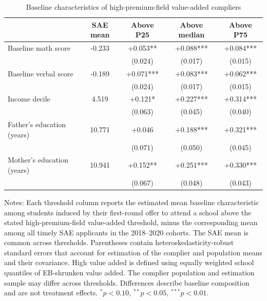 \begin{table}[!htbp]
\centering
\caption{Baseline characteristics of high-premium-field value-added compliers}
\label{tab:high-premium-field-va-complier-ses}
\begin{threeparttable}
\small
\setlength{\tabcolsep}{4pt}
\begin{tabular}{lcccc}
\toprule
 & SAE mean & Above P25 & Above median & Above P75 \\
\midrule
Baseline math score & -0.233 & +0.053** & +0.088*** & +0.084*** \\
 &  & (0.024) & (0.017) & (0.015) \\
Baseline verbal score & -0.189 & +0.071*** & +0.083*** & +0.062*** \\
 &  & (0.024) & (0.017) & (0.015) \\
Income decile & 4.519 & +0.121* & +0.227*** & +0.314*** \\
 &  & (0.063) & (0.045) & (0.040) \\
Father's education (years) & 10.771 & +0.046 & +0.188*** & +0.321*** \\
 &  & (0.071) & (0.050) & (0.045) \\
Mother's education (years) & 10.941 & +0.152** & +0.251*** & +0.330*** \\
 &  & (0.067) & (0.048) & (0.043) \\
\bottomrule
\end{tabular}
\begin{tablenotes}[flushleft]
\footnotesize
\item Notes: Each threshold column reports the estimated mean baseline characteristic among students induced by their first-round offer to attend a school above the stated high-premium-field value-added threshold, minus the corresponding mean among all timely SAE applicants in the 2018--2020 cohorts. The SAE mean is common across thresholds. Parentheses contain heteroskedasticity-robust standard errors that account for estimation of the complier and population means and their covariance. High value added is defined using equally weighted school quantiles of EB-shrunken value added. The complier population and estimation sample may differ across thresholds. Differences describe baseline composition and are not treatment effects. $^{*}p<0.10$, $^{**}p<0.05$, $^{***}p<0.01$.
\end{tablenotes}
\end{threeparttable}
\end{table}
